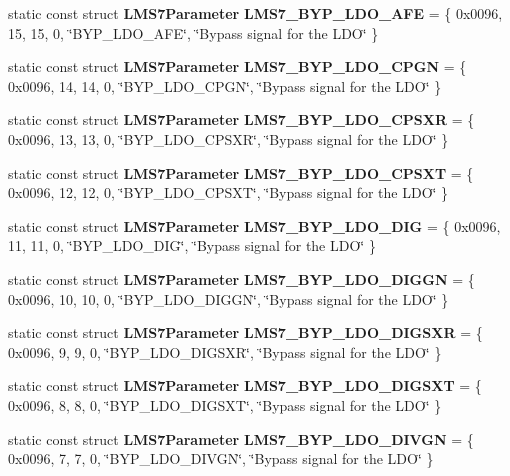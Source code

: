 \begin{DoxyCompactItemize}
\item 
static const struct {\bf L\+M\+S7\+Parameter} {\bf L\+M\+S7\+\_\+\+B\+Y\+P\+\_\+\+L\+D\+O\+\_\+\+A\+FE} = \{ 0x0096, 15, 15, 0, \char`\"{}\+B\+Y\+P\+\_\+\+L\+D\+O\+\_\+\+A\+F\+E\char`\"{}, \char`\"{}\+Bypass signal for the L\+D\+O\char`\"{} \}
\item 
static const struct {\bf L\+M\+S7\+Parameter} {\bf L\+M\+S7\+\_\+\+B\+Y\+P\+\_\+\+L\+D\+O\+\_\+\+C\+P\+GN} = \{ 0x0096, 14, 14, 0, \char`\"{}\+B\+Y\+P\+\_\+\+L\+D\+O\+\_\+\+C\+P\+G\+N\char`\"{}, \char`\"{}\+Bypass signal for the L\+D\+O\char`\"{} \}
\item 
static const struct {\bf L\+M\+S7\+Parameter} {\bf L\+M\+S7\+\_\+\+B\+Y\+P\+\_\+\+L\+D\+O\+\_\+\+C\+P\+S\+XR} = \{ 0x0096, 13, 13, 0, \char`\"{}\+B\+Y\+P\+\_\+\+L\+D\+O\+\_\+\+C\+P\+S\+X\+R\char`\"{}, \char`\"{}\+Bypass signal for the L\+D\+O\char`\"{} \}
\item 
static const struct {\bf L\+M\+S7\+Parameter} {\bf L\+M\+S7\+\_\+\+B\+Y\+P\+\_\+\+L\+D\+O\+\_\+\+C\+P\+S\+XT} = \{ 0x0096, 12, 12, 0, \char`\"{}\+B\+Y\+P\+\_\+\+L\+D\+O\+\_\+\+C\+P\+S\+X\+T\char`\"{}, \char`\"{}\+Bypass signal for the L\+D\+O\char`\"{} \}
\item 
static const struct {\bf L\+M\+S7\+Parameter} {\bf L\+M\+S7\+\_\+\+B\+Y\+P\+\_\+\+L\+D\+O\+\_\+\+D\+IG} = \{ 0x0096, 11, 11, 0, \char`\"{}\+B\+Y\+P\+\_\+\+L\+D\+O\+\_\+\+D\+I\+G\char`\"{}, \char`\"{}\+Bypass signal for the L\+D\+O\char`\"{} \}
\item 
static const struct {\bf L\+M\+S7\+Parameter} {\bf L\+M\+S7\+\_\+\+B\+Y\+P\+\_\+\+L\+D\+O\+\_\+\+D\+I\+G\+GN} = \{ 0x0096, 10, 10, 0, \char`\"{}\+B\+Y\+P\+\_\+\+L\+D\+O\+\_\+\+D\+I\+G\+G\+N\char`\"{}, \char`\"{}\+Bypass signal for the L\+D\+O\char`\"{} \}
\item 
static const struct {\bf L\+M\+S7\+Parameter} {\bf L\+M\+S7\+\_\+\+B\+Y\+P\+\_\+\+L\+D\+O\+\_\+\+D\+I\+G\+S\+XR} = \{ 0x0096, 9, 9, 0, \char`\"{}\+B\+Y\+P\+\_\+\+L\+D\+O\+\_\+\+D\+I\+G\+S\+X\+R\char`\"{}, \char`\"{}\+Bypass signal for the L\+D\+O\char`\"{} \}
\item 
static const struct {\bf L\+M\+S7\+Parameter} {\bf L\+M\+S7\+\_\+\+B\+Y\+P\+\_\+\+L\+D\+O\+\_\+\+D\+I\+G\+S\+XT} = \{ 0x0096, 8, 8, 0, \char`\"{}\+B\+Y\+P\+\_\+\+L\+D\+O\+\_\+\+D\+I\+G\+S\+X\+T\char`\"{}, \char`\"{}\+Bypass signal for the L\+D\+O\char`\"{} \}
\item 
static const struct {\bf L\+M\+S7\+Parameter} {\bf L\+M\+S7\+\_\+\+B\+Y\+P\+\_\+\+L\+D\+O\+\_\+\+D\+I\+V\+GN} = \{ 0x0096, 7, 7, 0, \char`\"{}\+B\+Y\+P\+\_\+\+L\+D\+O\+\_\+\+D\+I\+V\+G\+N\char`\"{}, \char`\"{}\+Bypass signal for the L\+D\+O\char`\"{} \}

\end{DoxyCompactItemize}
